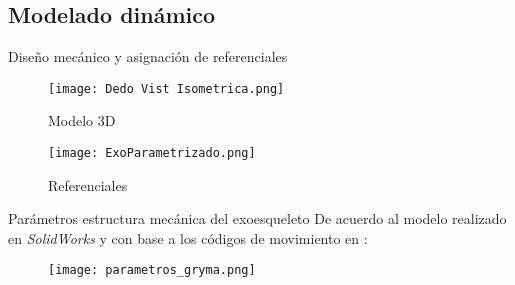 \subsection{Modelado dinámico}
\begin{frame}{Diseño mecánico y asignación de referenciales}
        \begin{multicols}{2}
        \begin{figure}
            \begin{center}
                \texttt{[image: Dedo Vist Isometrica.png]}
                \caption{Modelo 3D}
            \end{center}
        \end{figure}
        
        \columnbreak
        
        \begin{figure}
            \begin{center}
                \texttt{[image: ExoParametrizado.png]}
                \caption{Referenciales}
            \end{center}
        \end{figure}
            
        \end{multicols}
\end{frame}

\begin{frame}{Parámetros estructura mecánica del exoesqueleto}
De acuerdo al modelo realizado en \emph{SolidWorks} y con base a
los códigos de movimiento en \cite{rigid_multibody}:
    
    \begin{table}[]
        \begin{figure}[htpb]
            \begin{center}
                \texttt{[image: parametros\_gryma.png]}
                \label{fig:parametros_gryma}
            \end{center}
        \end{figure}
        \caption{Parámetros GRYMA}
    \end{table}
\end{frame}

